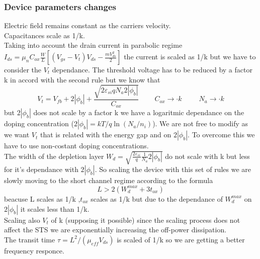 \subsubsection{Device parameters changes}
Electric field remains constant as the carriers velocity.\\
Capacitances scale as 1/k.\\
Taking into account the drain current in parabolic regime $I_{ds}=\mu_nC_{ox}\frac{W}{L}[(V_{gs}-V_t)V_{ds}-\frac{mV_{ds}^2}{2}]$ the current is scaled as 1/k but we have to consider the $V_t$ dependance. The threshold voltage has to be reduced by a factor k in accord with the second rule but we know that 
\begin{equation}
V_t=V_{fb}+2|\phi_b|+\frac{\sqrt{2\varepsilon_{si}qN_a2|\phi_b|}}{C_{ox}} \ \ \ \ \ \ \ \ \ \ C_{ox}\rightarrow \cdot k \ \ \ \ \ \ \ \ \ \ \ N_a \rightarrow \cdot k
\end{equation}
but $2|\phi_b|$ does not scale by a factor k we have a logaritmic dependance on the doping concentration ($2|\phi_b|=kT/q\ln(N_a/n_i)$). We are not free to modify as we want $V_t$ that is related with the energy gap and on $2|\phi_b|$. To overcome this we have to use non-costant doping concentrations.\\
The width of the depletion layer $W_d=\sqrt{\frac{2\varepsilon_{si}}{q}\frac{1}{N_a}2|\phi_b|}$ do not scale with k but less for it's dependance with $2|\phi_b|$. So scaling the device with this set of rules we are slowly moving to the short channel regime according to the formula 
\begin{equation}
L>2(W_d^{max}+3t_{ox})
\end{equation}
beacuse L scales as 1/k ,$t_{ox}$ scales as 1/k but due to the dependance of $W_{d}^{max}$ on $2|\phi_b|$ it scales less than 1/k.\\
Scaling also $V_t$ of k (supposing it possible) since the scaling process does not affect the STS we are exponentially increasing the off-power dissipation.\\
The transit time $\tau=L^2/(\mu_{eff}V_{ds})$ is scaled of 1/k so we are getting a better frequency responce.\\

